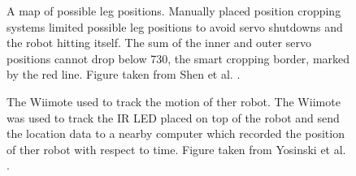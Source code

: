 \begin{figure}
\begin{center}
\vspace{1cm}
\caption[ ]{A map of possible leg positions. Manually placed position cropping systems limited possible leg positions to avoid servo shutdowns and the robot hitting itself. The sum of the inner and outer servo positions cannot drop below 730, the smart cropping border, marked by the red line. Figure taken from Shen et al. \cite{haocheng}.}
\end{center}
\end{figure}
%


\begin{figure}
\begin{center}
\vspace{1cm}
\caption[ ]{The Wiimote used to track the motion of ther robot. The Wiimote was used to track the IR LED placed on top of the robot and send the location data to a nearby computer which recorded the position of ther robot with respect to time. Figure taken from Yosinski et al. \cite{yos:clune}.}
\end{center}
\end{figure}
